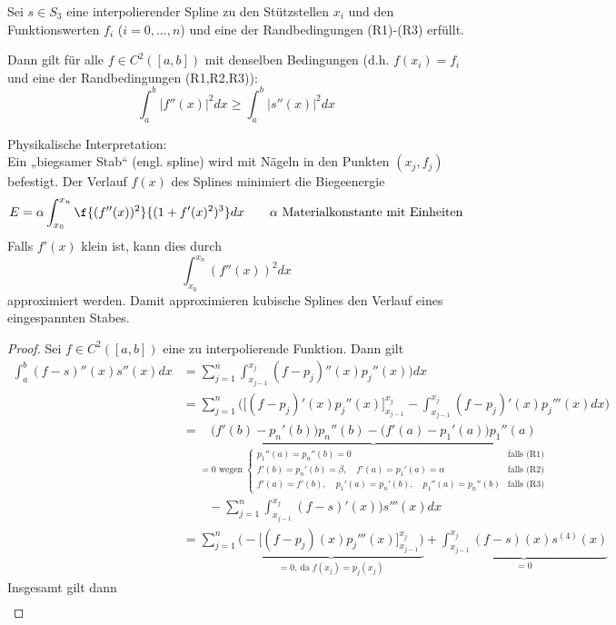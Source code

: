 \documentclass[11pt]{scrbook}
\begin{document}
\begin{st}[Optimalität]
	\label{1.33}
	Sei $s\in S_3$ eine interpolierender Spline zu den Stützstellen $x_i$ und den Funktionswerten $f_i$ ($i=0,\dotsc,n$)
	und eine der Randbedingungen (R1)-(R3) erfüllt.

	Dann gilt für alle $f\in C^2([a,b])$ mit denselben Bedingungen (d.h. $f(x_i)=f_i$ und eine der Randbedingungen (R1,R2,R3)):
	\[
		\int_a^b |f''(x)|^2 dx \ge \int_a^b |s''(x)|^2  dx
	\]
	\begin{note}
		 Physikalische Interpretation: \\
		Ein „biegsamer Stab“ (engl. spline) wird mit Nägeln in den Punkten $(x_j,f_j)$ befestigt.
		Der Verlauf $f(x)$ des Splines minimiert die Biegeenergie
		\[
			E = \alpha \int_{x_0}^{x_n}\f {(f''(x))^2}{(1+f'(x)^2)^3} dx \qquad \alpha \text{ Materialkonstante mit Einheiten}
		\]
		Falls $f'(x)$ klein ist, kann dies durch
		\[
			\int_{x_0}^{x_n} (f''(x))^2 dx
		\]
		approximiert werden.
		Damit approximieren kubische Splines den Verlauf eines eingespannten Stabes.
	\end{note}
	\begin{proof}
		Sei $f\in C^2([a,b])$ eine zu interpolierende Funktion.
		Dann gilt
		\begin{align*}
			\int_a^b (f-s)''(x) s''(x) dx 
			&= \sum_{j=1}^n \int_{x_{j-1}}^{x_j} (f-p_j)''(x)p_j''(x)) dx \\
			&= \sum_{j=1}^n \bigg( \Big[(f-p_j)'(x)p_j''(x)\Big]_{x_{j-1}}^{x_j} - \int_{x_{j-1}}^{x_j} (f-p_j)'(x)p_j'''(x) dx \bigg)\\
			&= \underbrace{\Big( f'(b) - p_n'(b)\Big) p_n''(b) - \Big( f'(a)-p_1'(a)\Big) p_1''(a)}_{\displaystyle =0 \text{ wegen } \begin{cases} 
				p_1''(a) = p_n''(b) = 0 & \text{falls (R1)} \\
				f'(b) = p_n'(b) = \beta,\quad f'(a) = p_1'(a) = \alpha  &\text{falls (R2)} \\
				f'(a) = f'(b),\quad p_1'(a)=p_n'(b),\quad p_1''(a)=p_n''(b) & \text{falls (R3)}
				\end{cases}}  \\
			&\qquad - \sum_{j=1}^n \int_{x_{j-1}}^{x_j} (f-s)'(x))s'''(x) dx \\
			&= \sum_{j=1}^n \underbrace{\bigg(-\Big[(f-p_j)(x)p_j'''(x)\Big]_{x_{j-1}}^{x_j}\bigg)}_{=0 \text{, da } f(x_j)=p_j(x_j)} + \underbrace{\int_{x_{j-1}}^{x_j} (f-s)(x)s^{(4)}(x)}_{=0}
		\end{align*}
		Insgesamt gilt dann
		\begin{align*}

\end{align*}
\end{proof}
\end{st}
\end{document}
